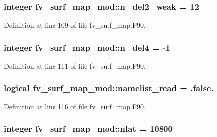 \subsubsection[{n\-\_\-del2\-\_\-weak}]{\setlength{\rightskip}{0pt plus 5cm}integer fv\-\_\-surf\-\_\-map\-\_\-mod\-::n\-\_\-del2\-\_\-weak = 12\hspace{0.3cm}{\ttfamily [private]}}\label{classfv__surf__map__mod_a2f02a11eec518babdafb7c9a49d3cb9b}


Definition at line 109 of file fv\-\_\-surf\-\_\-map.\-F90.

\subsubsection[{n\-\_\-del4}]{\setlength{\rightskip}{0pt plus 5cm}integer fv\-\_\-surf\-\_\-map\-\_\-mod\-::n\-\_\-del4 = -\/1\hspace{0.3cm}{\ttfamily [private]}}\label{classfv__surf__map__mod_ab6c0587435e49a2dfc4980e976ea49a1}


Definition at line 111 of file fv\-\_\-surf\-\_\-map.\-F90.

\subsubsection[{namelist\-\_\-read}]{\setlength{\rightskip}{0pt plus 5cm}logical fv\-\_\-surf\-\_\-map\-\_\-mod\-::namelist\-\_\-read = .false.\hspace{0.3cm}{\ttfamily [private]}}\label{classfv__surf__map__mod_a297f7387531f5640abd6cd59d925bf83}


Definition at line 116 of file fv\-\_\-surf\-\_\-map.\-F90.

\subsubsection[{nlat}]{\setlength{\rightskip}{0pt plus 5cm}integer fv\-\_\-surf\-\_\-map\-\_\-mod\-::nlat = 10800\hspace{0.3cm}{\ttfamily [private]}}\label{classfv__surf__map__mod_a7fdae69a68724b43026ac21d8a40a60f}



